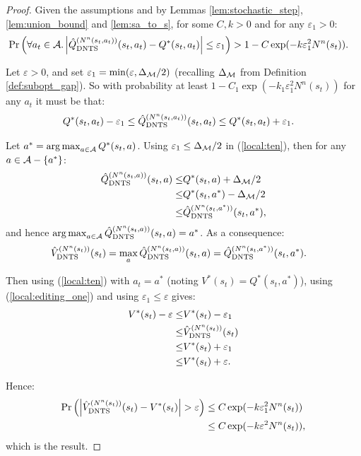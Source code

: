     \begin{proof}
        Given the assumptions and by Lemmas \ref{lem:stochastic_step}, \ref{lem:union_bound} and \ref{lem:sa_to_s}, for some $C,k>0$ and for any $\varepsilon_1>0$:
        \begin{align}
            \Pr\left(\forall a_t\in\mathcal{A}. \left|{\hat{Q}^{(N^n(s_t,a_t))}_{{\textnormal{DNTS}}}}(s_t,a_t)-Q^*(s_t,a_t)\right|
                \leq \varepsilon_1\right) &> 1-C \exp(-k \varepsilon_1^2 N^n(s_t)).
        \end{align}
        
        Let $\varepsilon >0$, and set $\varepsilon_1 = \min(\varepsilon,\Delta_{\mathcal{M}}/2)$ (recalling $\Delta_{\mathcal{M}}$ from Definition \ref{def:subopt_gap}). So with probability at least $1-C_1 \exp(-k_1 \varepsilon_1^2 N^n(s_t))$ for any $a_t$ it must be that:
        \begin{align}
            Q^*(s_t,a_t) - \varepsilon_1 \leq {\hat{Q}^{(N^n(s_t,a_t))}_{{\textnormal{DNTS}}}}(s_t,a_t) &\leq Q^*(s_t,a_t) + \varepsilon_1. 
                \label{local:ten}
        \end{align}
        
        Let $a^*=\operatorname*{arg\,max}_{a\in\mathcal{A}} Q^*(s_t,a)$. Using $\varepsilon_1 \leq \Delta_{\mathcal{M}}/2$ in (\ref{local:ten}), then for any $a\in\mathcal{A}-\{ a^*\}$:
        \begin{align}
            {\hat{Q}^{(N^n(s_t,a))}_{{\textnormal{DNTS}}}}(s_t,a) \leq& Q^*(s_t,a) + \Delta_{\mathcal{M}}/2 \\
                \leq& Q^*(s_t,a^*) - \Delta_{\mathcal{M}}/2 \\
                \leq& {\hat{Q}^{(N^n(s_t,a^*))}_{{\textnormal{DNTS}}}}(s_t,a^*),
        \end{align}
        and hence $\operatorname*{arg\,max}_{a\in\mathcal{A}} {\hat{Q}^{(N^n(s_t,a))}_{{\textnormal{DNTS}}}}(s_t,a) = a^*$. As a consequence:
        \begin{align}
            {\hat{V}^{(N^n(s_t))}_{{\textnormal{DNTS}}}}(s_t) &= \max_a {\hat{Q}^{(N^n(s_t,a))}_{{\textnormal{DNTS}}}}(s_t,a) = {\hat{Q}^{(N^n(s_t,a^*))}_{{\textnormal{DNTS}}}}(s_t,a^*). 
                \label{local:editing_one}
        \end{align}
        
        Then using (\ref{local:ten}) with $a_t=a^*$ (noting $V^*(s_t)=Q^*(s_t,a^*)$), using (\ref{local:editing_one}) and using $\varepsilon_1 \leq \varepsilon$ gives:
        \begin{align}
            V^*(s_t) - \varepsilon
                \leq& V^*(s_t) - \varepsilon_1 \\
                \leq& {\hat{V}^{(N^n(s_t))}_{{\textnormal{DNTS}}}}(s_t) \\
                \leq& V^*(s_t) + \varepsilon_1 \\
                \leq& V^*(s_t) + \varepsilon. 
        \end{align}
        
        Hence:
        \begin{align}
            \Pr\left(\left|{\hat{V}^{(N^n(s_t))}_{{\textnormal{DNTS}}}}(s_t)-V^*(s_t)\right| > \varepsilon\right) 
                &\leq C \exp(-k \varepsilon_1^2 N^n(s_t)) \\
                &\leq C \exp(-k \varepsilon^2 N^n(s_t)),
        \end{align}
        which is the result.
    \end{proof}



